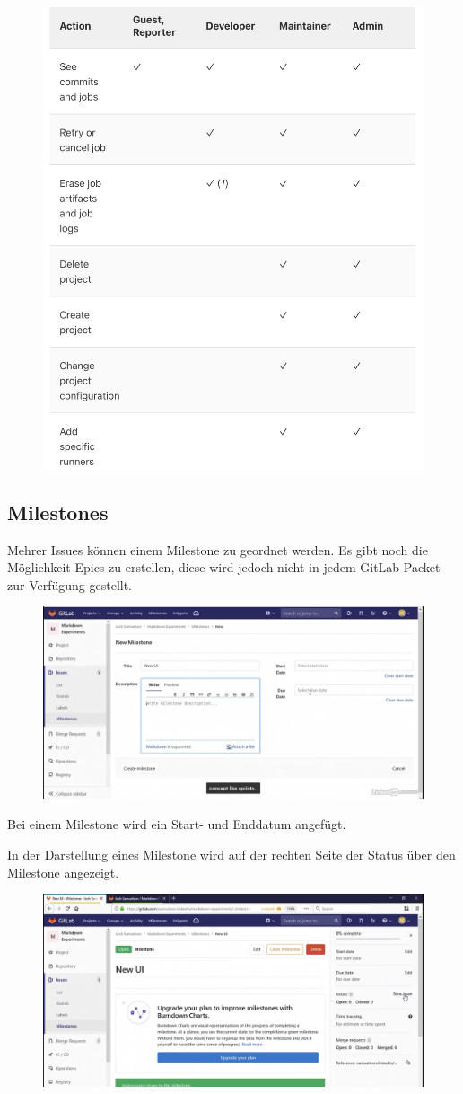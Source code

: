 \begin{figure}[H]
	\centering
	\includegraphics[width=0.7\linewidth]{attachment/chapter_5/Scc011}
\end{figure}

\subsection{Milestones}
Mehrer Issues können einem Milestone zu geordnet werden. Es gibt noch die Möglichkeit Epics zu erstellen, diese wird jedoch nicht in jedem GitLab Packet zur Verfügung gestellt.

\begin{figure}[H]
	\centering
	\includegraphics[width=0.7\linewidth]{attachment/chapter_5/Scc013}
\end{figure}
Bei einem Milestone wird ein Start- und Enddatum angefügt.

In der Darstellung eines Milestone wird auf der rechten Seite der Status über den Milestone angezeigt.

\begin{figure}[H]
	\centering
	\includegraphics[width=0.7\linewidth]{attachment/chapter_5/Scc014}
	
\end{figure}

